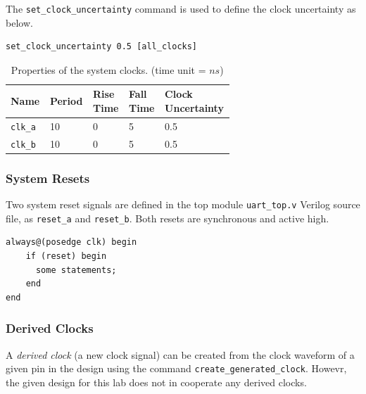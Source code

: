 \documentclass[a4paper,11pt]{article}%
\begin{document}
The {\tt set\_clock\_uncertainty}\cite{genus_command_ref_2019} command is used to define the clock uncertainty as below.

\begin{Verbatim}[frame=single]
set_clock_uncertainty 0.5 [all_clocks]
\end{Verbatim}

\begin{table}[h]
	\centering
	\caption{Properties of the system clocks. (time unit = $ns$)}
	\begin{tabular}{|L{0.15\linewidth}  |C{0.12\linewidth}  | C{0.12\linewidth} | C{0.12\linewidth} | C{0.12\linewidth} |} \hline
		Name & Period & Rise Time & Fall Time & Clock Uncertainty\\ \hline
		{\tt clk\_a} & 10 & 0 & 5 & 0.5\\ \hline
		{\tt clk\_b} & 10 & 0 & 5 & 0.5\\ \hline
	\end{tabular}
	\label{table:clocks}
\end{table}

\subsubsection{System Resets}
Two system reset signals are defined in the top module {\tt uart\_top.v} Verilog source file, as {\tt reset\_a}  and {\tt reset\_b}. Both resets are synchronous and active high.

\begin{Verbatim}[frame=single]
always@(posedge clk) begin	
    if (reset) begin
      some statements;	   
    end
end
\end{Verbatim}

\subsubsection{Derived Clocks}

A \textit{derived clock} (a new clock signal) can be created from the clock waveform of a given pin in the design using the command {\tt create\_generated\_clock}\cite{genus_command_ref_2019}. Howevr, the given design for this lab does not in cooperate any derived clocks.

\pagebreak



\end{document}
